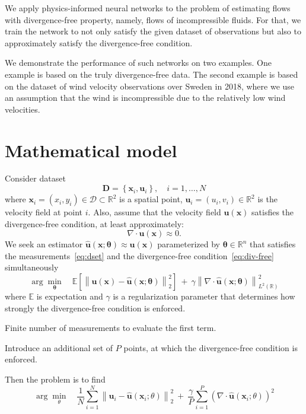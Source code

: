 \documentclass[pamm,a4paper,fleqn]{w-art}
\renewcommand{\vec}[1]{\boldsymbol{#1}}
\newcommand{\R}{\mathbb R}
\newcommand{\norm}[1]{\left\lVert#1\right\rVert}
\begin{document}
We apply physics-informed neural networks to the problem of estimating flows
with divergence-free property, namely, flows of incompressible fluids.
For that, we train the network to not only satisfy the given dataset of
observations but also to approximately satisfy the divergence-free condition.

We demonstrate the performance of such networks on two examples.
One example is based on the truly divergence-free data.
The second example is based on the dataset of wind velocity observations over
Sweden in 2018, where we use an assumption that the wind is incompressible due
to the relatively low wind velocities.

\section{Mathematical model}
Consider dataset
\begin{equation}
  \label{eq:dset}
  \vec{D} = \left\{\vec{x}_i, \vec{u}_i\right\}, \quad i = 1, \dots, N
\end{equation}
where $\vec{x}_i = (x_i, y_i) \in \mathcal D \subset \R^2$ is a spatial point,
$\vec{u}_i = (u_i, v_i) \in \R^2$ is the velocity field at point $i$.
Also, assume that the velocity field $\vec u (\vec x)$ satisfies the
divergence-free condition, at least approximately:
\begin{equation}
  \label{eq:div-free}
  \nabla \cdot \vec u (\vec x) \approx 0.
\end{equation}
We seek an estimator $\hat{\vec u} (\vec x; \vec \theta)\approx \vec u(\vec x)$
parameterized by $\vec \theta \in \R^n$ that satisfies
the measurements~\eqref{eq:dset} and the divergence-free
condition~\eqref{eq:div-free} simultaneously
\begin{equation}
  \arg \min_{\vec \theta} \quad 
  \mathbb E \left[
    \norm{\vec u(\vec x) - \hat{\vec u}(\vec x; \vec{\theta})}^2_2
  \right] \ + \ 
  \gamma \norm{\nabla \cdot \hat{\vec u}(\vec x; \vec{\theta})}^2_{L^2(\R)} 
\end{equation}
where $\mathbb E$ is expectation
and $\gamma$ is a regularization parameter that determines how strongly
the divergence-free condition is enforced.

Finite number of measurements to evaluate the first term. 

Introduce an additional set of $P$ points, at which
the divergence-free condition is enforced.

Then the problem is to find
\[
  \arg \min_\theta \quad
  \frac{1}{N} \sum_{i=1}^N \norm{\vec u_i - \hat{\vec u}(\vec x_i; \theta)}^2_2
  \ + \ 
  \frac{\gamma}{P} \sum_{i=1}^P \left( \nabla \cdot \hat{\vec u}(\vec x_i; \theta)\right)^2
\]
\end{document}

